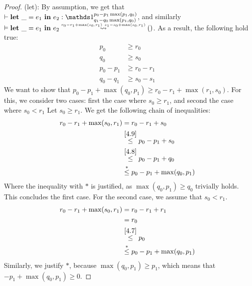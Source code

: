 \begin{proof}
   (let): By assumption, we get that \(\typing{}{\letexp{\_}{e_1}{e_2}}{\ratype{\unit}{p_0 - p_1 \max(p_1, q_0)}{q_1 - q_0 \max(p_1, q_0)}}\), and similarly \(\evals{}{\letexp{\_}{e_1}{e_2}}{()}{r_0 - r_1 + \max(s_0, r_1)}{s_1 - s_0 + \max(s_0, r_1)}\). As a result, the following hold true:
   \begin{align}
      p_0         &\geq r_0 \label{4.7}\\
      q_0         &\geq s_0 \label{4.8} \\
      p_0 - p_1   &\geq r_0 - r_1 \label{4.9} \\
      q_0 - q_1   &\geq s_0 - s_1 \label{4.10}
   \end{align}
   We want to show that \(p_0 - p_1 + \max(q_0, p_1) \geq r_0 - r_1 + \max(r_1, s_0)\). For this, we consider two cases: first the case where \(s_0 \geq r_1\), and second the case where \(s_0 < r_1\)
   Let \(s_0 \geq r_1\). We get the following chain of inequalities:
   \begin{align*}
      r_0 - r_1 + \max(s_0, r_1) &= r_0 - r_1 + s_0 \\
                                 &\stackrel{\ref{4.9}}{\leq}p_0 - p_1 + s_0\\
                                 &\stackrel{\ref{4.8}}{\leq}p_0 - p_1 + q_0\\
                                 &\stackrel{*}{\leq}p_0 - p_1 + \max(q_0, p_1)
   \end{align*}
   Where the inequality with \(*\) is justified, as \(\max(q_0, p_1) \geq q_0\) trivially holds. This concludes the first case.
   For the second case, we assume that \(s_0 < r_1\). 
   \begin{align*}
      r_0 - r_1 + \max(s_0, r_1) &= r_0 - r_1 + r_1 \\
                                 &= r_0 \\
                                 &\stackrel{\ref{4.7}}{\leq} p_0\\
                                 &\stackrel{*}{\leq} p_0 - p_1 + \max(q_0, p_1)
   \end{align*}
   Similarly, we justify \(*\), because \(\max(q_0, p_1) \geq p_1\), which means that \(-p_1 + \max(q_0, p_1) \geq 0\). 
\end{proof}
